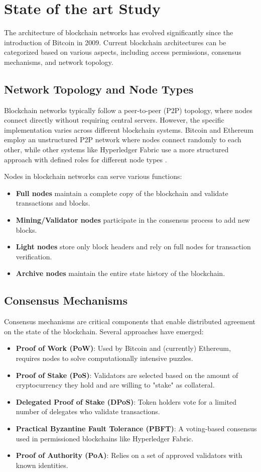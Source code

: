 \documentclass[twoside]{article}
\begin{document}
\section{State of the art Study}
The architecture of blockchain networks has evolved significantly since the introduction of Bitcoin in 2009. Current blockchain architectures can be categorized based on various aspects, including access permissions, consensus mechanisms, and network topology.

\subsection{Network Topology and Node Types}
Blockchain networks typically follow a peer-to-peer (P2P) topology, where nodes connect directly without requiring central servers. However, the specific implementation varies across different blockchain systems. Bitcoin and Ethereum employ an unstructured P2P network where nodes connect randomly to each other, while other systems like Hyperledger Fabric use a more structured approach with defined roles for different node types \cite{patnaik}.

Nodes in blockchain networks can serve various functions:
\begin{itemize}
  \item \textbf{Full nodes} maintain a complete copy of the blockchain and validate transactions and blocks.
  \item \textbf{Mining/Validator nodes} participate in the consensus process to add new blocks.
  \item \textbf{Light nodes} store only block headers and rely on full nodes for transaction verification.
  \item \textbf{Archive nodes} maintain the entire state history of the blockchain.
\end{itemize}

\subsection{Consensus Mechanisms}
Consensus mechanisms are critical components that enable distributed agreement on the state of the blockchain. Several approaches have emerged:
\begin{itemize}
  \item \textbf{Proof of Work (PoW)}: Used by Bitcoin and (currently) Ethereum, requires nodes to solve computationally intensive puzzles.
  \item \textbf{Proof of Stake (PoS)}: Validators are selected based on the amount of cryptocurrency they hold and are willing to "stake" as collateral.
  \item \textbf{Delegated Proof of Stake (DPoS)}: Token holders vote for a limited number of delegates who validate transactions.
  \item \textbf{Practical Byzantine Fault Tolerance (PBFT)}: A voting-based consensus used in permissioned blockchains like Hyperledger Fabric.
  \item \textbf{Proof of Authority (PoA)}: Relies on a set of approved validators with known identities.
\end{itemize}
\end{document}

